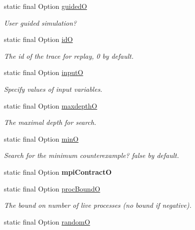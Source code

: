 \begin{DoxyCompactItemize}
static final Option \hyperlink{classedu_1_1udel_1_1cis_1_1vsl_1_1civl_1_1config_1_1IF_1_1CIVLConstants_a16a8c2d0190f4db9abd16181c6afb62a}{guided\+O}
\begin{DoxyCompactList}\small\item\em User guided simulation? \end{DoxyCompactList}\item 
static final Option \hyperlink{classedu_1_1udel_1_1cis_1_1vsl_1_1civl_1_1config_1_1IF_1_1CIVLConstants_a75d46ae43a99346dffc62bf4668c783b}{id\+O}
\begin{DoxyCompactList}\small\item\em The id of the trace for replay, 0 by default. \end{DoxyCompactList}\item 
static final Option \hyperlink{classedu_1_1udel_1_1cis_1_1vsl_1_1civl_1_1config_1_1IF_1_1CIVLConstants_a4c3d1e80864a56b12fef813c9cf1457e}{input\+O}
\begin{DoxyCompactList}\small\item\em Specify values of input variables. \end{DoxyCompactList}\item 
static final Option \hyperlink{classedu_1_1udel_1_1cis_1_1vsl_1_1civl_1_1config_1_1IF_1_1CIVLConstants_acc4f28de5ebc6896e349b4062f13c938}{maxdepth\+O}
\begin{DoxyCompactList}\small\item\em The maximal depth for search. \end{DoxyCompactList}\item 
static final Option \hyperlink{classedu_1_1udel_1_1cis_1_1vsl_1_1civl_1_1config_1_1IF_1_1CIVLConstants_a35e8baff76ae167e4d07197907fafe84}{min\+O}
\begin{DoxyCompactList}\small\item\em Search for the minimum counterexample? false by default. \end{DoxyCompactList}\item 
static final Option {\bfseries mpi\+Contract\+O}
\item 
static final Option \hyperlink{classedu_1_1udel_1_1cis_1_1vsl_1_1civl_1_1config_1_1IF_1_1CIVLConstants_a8fdd648c7a222f4855d9ed644c818e6f}{proc\+Bound\+O}
\begin{DoxyCompactList}\small\item\em The bound on number of live processes (no bound if negative). \end{DoxyCompactList}\item 
static final Option \hyperlink{classedu_1_1udel_1_1cis_1_1vsl_1_1civl_1_1config_1_1IF_1_1CIVLConstants_a5372bfb45f6d88e4f226d45d179419a2}{random\+O}

\end{DoxyCompactItemize}
